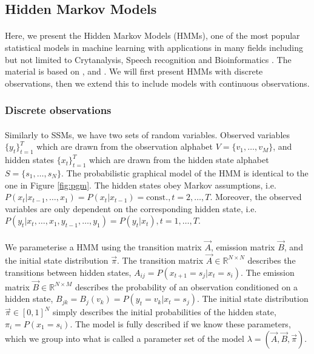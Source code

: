 \subsection{Hidden Markov Models}

\paragraph{}
	Here, we present the Hidden Markov Models (HMMs), one of the most popular statistical models in machine learning with applications in many fields including but not limited to Crytanalysis, Speech recognition and Bioinformatics \cite{wiki:HMM}. The material is based on \cite{rabiner1989tutorial}, \cite{ramage07} and \cite{mlBook}. We will first present HMMs with discrete observations, then we extend this to include models with continuous observations.
	
\subsubsection{Discrete observations}
\paragraph{}
	Similarly to SSMs, we have two sets of random variables. Observed variables $\{ y_t \}_{t = 1}^T$ which are drawn from the observation alphabet $V = \{v_1, \dotsc, v_M\}$, and hidden states $\{ x_t \}_{t = 1}^T$ which are drawn from the hidden state alphabet $S = \{ s_1, \dotsc, s_N \}$. The probabilistic graphical model of the HMM is identical to the one in Figure \ref{fig:pgm}. The hidden states obey Markov assumptions, i.e. $P( x_t | x_{t - 1}, \dotsc, x_1) = P(x_t | x_{t - 1}) = \text{const.}, t = 2, \dotsc, T$. Moreover, the observed variables are only dependent on the corresponding hidden state, i.e. $P( y_t | x_t, \dotsc, x_1, y_{t - 1}, \dotsc, y_1) = P(y_t | x_t), t = 1, \dotsc, T$.
	
\paragraph{}
	We parameterise a HMM using the transition matrix $\vec A$, emission matrix $\vec B$, and the initial state distribution $\vec \pi$. The transition matrix $\vec A \in \mathbb{R}^{N \times N}$ describes the transitions between hidden states, $A_{ij} = P(x_{t + 1} = s_j | x_t = s_i)$. The emission matrix $\vec B \in \mathbb{R}^{N \times M}$ describes the probability of an observation conditioned on a hidden state, $B_{jk} = B_{j}(v_k) = P(y_t = v_k | x_t = s_j)$. The initial state distribution $\vec \pi \in [0, 1]^N$ simply describes the initial probabilities of the hidden state, $\pi_i = P(x_1 = s_i)$. The model is fully described if we know these parameters, which we group into what is called a parameter set of the model $\lambda = (\vec A, \vec B, \vec \pi)$.
	

